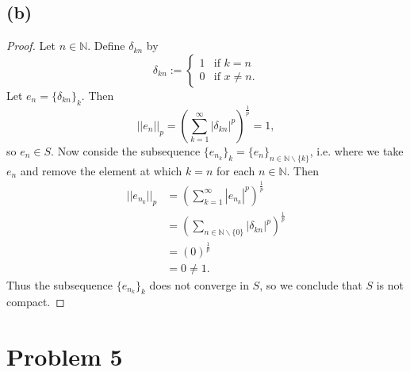 \documentclass{article}
\begin{document}
\subsection*{(b)}
\begin{proof}
	Let $n\in\mathbb{N}$. Define $\delta_{kn}$ by 
	\begin{equation}
		\delta_{kn}:=
		\begin{cases}
			1 & \text{if } k=n\\
			0 & \text{if } x\neq n.
		\end{cases}
	\end{equation}
	Let $e_n = \{\delta_{kn}\}_{k}$. Then
	\begin{equation}
		||e_n||_p = \left(\sum_{k=1}^{\infty}|\delta_{kn}|^p\right)^\frac{1}{p} = 1,
	\end{equation}
	so $e_n \in S$. Now conside the subsequence $\{e_{n_k}\}_k = \{e_n\}_{n\in\mathbb{N}\backslash\{k\}}$, i.e. where we take $e_n$ and remove the element at which $k=n$ for each $n\in\mathbb{N}$. Then
	\begin{align}
		||e_{n_k}||_p &= \left(\sum_{k=1}^{\infty}|e_{n_k}|^p\right)^\frac{1}{p}\\
		&= \left(\sum_{n\in\mathbb{N}\backslash\{0\}}|\delta_{kn}|^p\right)^\frac{1}{p}\\
		&= (0)^\frac{1}{p}\\
		&= 0 \neq 1.
	\end{align}
	Thus the subsequence $\{e_{n_k}\}_k$ does not converge in $S$, so we conclude that $S$ is not compact.
\end{proof}
\section*{Problem 5}
\end{document}
